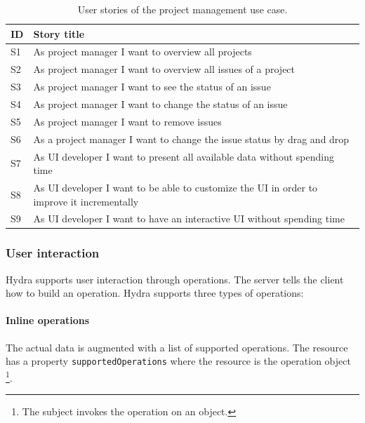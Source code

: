 \begin{table}[!htb]
  \begin{center}
    \begin{tabular}{ |l|l| }
      \hline
      \textbf{ID} & \textbf{Story title} \\
      \hline
      S1 & As project manager I want to overview all projects \\
      \hline
      S2 & As project manager I want to overview all issues of a project \\
      \hline
      S3 & As project manager I want to see the status of an issue \\
      \hline
      S4 & As project manager I want to change the status of an issue \\
      \hline
      S5 & As project manager I want to remove issues \\
      \hline
      S6 & As a project manager I want to change the issue status by drag and drop \\
      \hline
      S7 & As UI developer I want to present all available data without spending time \\
      \hline
      S8 & As UI developer I want to be able to customize the UI in order to improve it incrementally \\
      \hline
      S9 & As UI developer I want to have an interactive UI without spending time \\
      \hline
    \end{tabular}
    \caption{User stories of the project management use case.}
    \label{tab:usecase2}
  \end{center}
\end{table}

\clearpage

\subsubsection{User interaction}
Hydra supports user interaction through operations. The server tells the client how to build an operation. Hydra supports three types of operations:

\paragraph{Inline operations}
The actual data is augmented with a list of supported operations. The resource has a property \lstinline{supportedOperations} where the resource is the operation object \footnote{The subject invokes the operation on an object.}.

